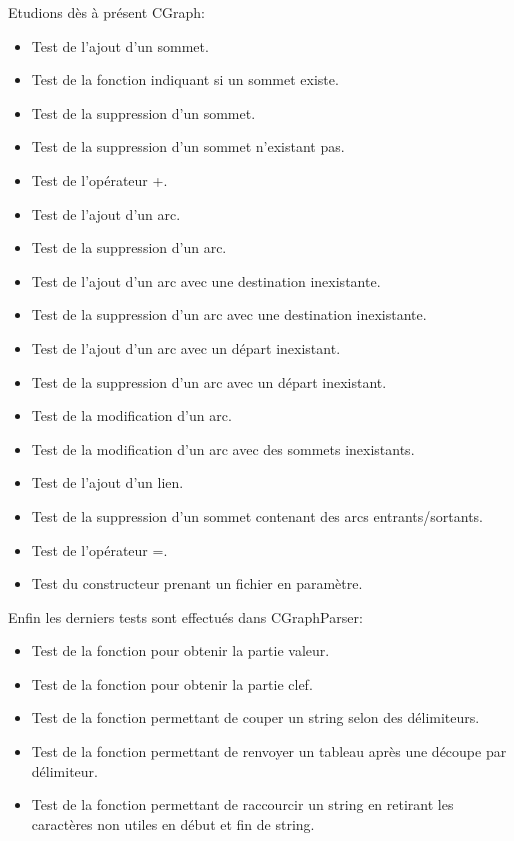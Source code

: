 		Etudions dès à présent CGraph:
		\begin{itemize}
			\item Test de l'ajout d'un sommet.
			\item Test de la fonction indiquant si un sommet existe.
			\item Test de la suppression d'un sommet.
			\item Test de la suppression d'un sommet n'existant pas.
			\item Test de l'opérateur +.
			\item Test de l'ajout d'un arc.
			\item Test de la suppression d'un arc.
			\item Test de l'ajout d'un arc avec une destination inexistante.
			\item Test de la suppression d'un arc avec une destination inexistante.
			\item Test de l'ajout d'un arc avec un départ inexistant.
			\item Test de la suppression d'un arc avec un départ inexistant.
			\item Test de la modification d'un arc.
			\item Test de la modification d'un arc avec des sommets inexistants.
			\item Test de l'ajout d'un lien.
			\item Test de la suppression d'un sommet contenant des arcs entrants/sortants.
			\item Test de l'opérateur =.
			\item Test du constructeur prenant un fichier en paramètre.
		\end{itemize}
		
		Enfin les derniers tests sont effectués dans CGraphParser:
		\begin{itemize}
			\item Test de la fonction pour obtenir la partie valeur.
			\item Test de la fonction pour obtenir la partie clef.
			\item Test de la fonction permettant de couper un string selon des délimiteurs.
			\item Test de la fonction permettant de renvoyer un tableau après une découpe par délimiteur.
			\item Test de la fonction permettant de raccourcir un string en retirant les caractères non utiles en début et fin de string.
		\end{itemize}
	
